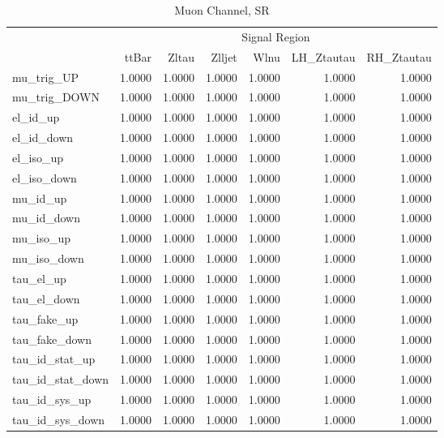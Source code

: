 \documentclass[11pt,oneside,a4paper]{article}
\begin{document}
\begin{table}
\begin{tabular}{lrrrrrr}
 & \multicolumn{6}{c}{Signal Region} \\
 & ttBar & Zltau & Zlljet & Wlnu & LH\_Ztautau & RH\_Ztautau \\
 mu\_trig\_UP & 1.0000 & 1.0000 & 1.0000 & 1.0000 & 1.0000 & 1.0000 \\
 mu\_trig\_DOWN & 1.0000 & 1.0000 & 1.0000 & 1.0000 & 1.0000 & 1.0000 \\
el\_id\_up & 1.0000 & 1.0000 & 1.0000 & 1.0000 & 1.0000 & 1.0000 \\
el\_id\_down & 1.0000 & 1.0000 & 1.0000 & 1.0000 & 1.0000 & 1.0000 \\
el\_iso\_up & 1.0000 & 1.0000 & 1.0000 & 1.0000 & 1.0000 & 1.0000 \\
el\_iso\_down & 1.0000 & 1.0000 & 1.0000 & 1.0000 & 1.0000 & 1.0000 \\
mu\_id\_up & 1.0000 & 1.0000 & 1.0000 & 1.0000 & 1.0000 & 1.0000 \\
mu\_id\_down & 1.0000 & 1.0000 & 1.0000 & 1.0000 & 1.0000 & 1.0000 \\
mu\_iso\_up & 1.0000 & 1.0000 & 1.0000 & 1.0000 & 1.0000 & 1.0000 \\
mu\_iso\_down & 1.0000 & 1.0000 & 1.0000 & 1.0000 & 1.0000 & 1.0000 \\
tau\_el\_up & 1.0000 & 1.0000 & 1.0000 & 1.0000 & 1.0000 & 1.0000 \\
tau\_el\_down & 1.0000 & 1.0000 & 1.0000 & 1.0000 & 1.0000 & 1.0000 \\
tau\_fake\_up & 1.0000 & 1.0000 & 1.0000 & 1.0000 & 1.0000 & 1.0000 \\
tau\_fake\_down & 1.0000 & 1.0000 & 1.0000 & 1.0000 & 1.0000 & 1.0000 \\
tau\_id\_stat\_up & 1.0000 & 1.0000 & 1.0000 & 1.0000 & 1.0000 & 1.0000 \\
tau\_id\_stat\_down & 1.0000 & 1.0000 & 1.0000 & 1.0000 & 1.0000 & 1.0000 \\
tau\_id\_sys\_up & 1.0000 & 1.0000 & 1.0000 & 1.0000 & 1.0000 & 1.0000 \\
tau\_id\_sys\_down & 1.0000 & 1.0000 & 1.0000 & 1.0000 & 1.0000 & 1.0000 \\
\end{tabular}
\caption{Muon Channel, SR}
\end{table}
\end{document}
